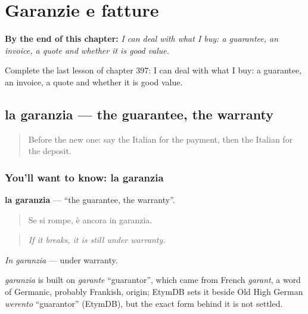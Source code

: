 
\chapter{Garanzie e fatture}
\label{ch:it-garanzie-e-fatture}

\begin{chapteropening}
\textbf{By the end of this chapter:} \emph{I can deal with what I buy: a guarantee, an invoice, a quote and whether it is good value.}

Complete the last lesson of chapter 397: I can deal with what I buy: a guarantee, an invoice, a quote and whether it is good value.
\end{chapteropening}

\section[la garanzia]{la garanzia — the guarantee, the warranty}

\label{lesson:IT-C397-garanzia}



\begin{quote}
Before the new one: say the Italian for the payment, then the Italian for the deposit.
\end{quote}

\subsection*{You'll want to know: la garanzia}
\textbf{la garanzia} — \textquotedblleft{}the guarantee, the warranty\textquotedblright{}.

\begin{quote}
Se si rompe, è ancora in garanzia.
\end{quote}

\begin{quote}
\emph{If it breaks, it is still under warranty.}
\end{quote}

\emph{In garanzia} — under warranty.

\begin{cousinweb}
\emph{garanzia} is built on \emph{garante} \textquotedblleft{}guarantor\textquotedblright{}, which came from French \emph{garant}, a word of Germanic, probably Frankish, origin; EtymDB sets it beside Old High German \emph{werento} \textquotedblleft{}guarantor\textquotedblright{} (EtymDB), but the exact form behind it is not settled.
\end{cousinweb}

